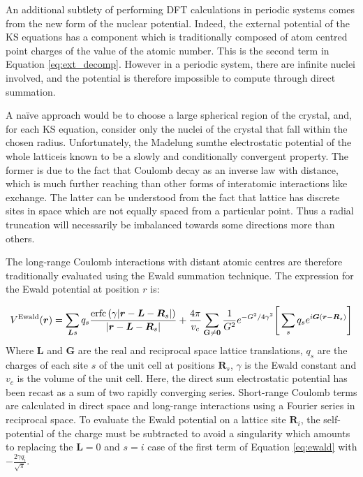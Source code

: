 An additional subtlety of performing DFT calculations in periodic systems comes from the new form of the nuclear potential. Indeed, the external potential of the KS equations has a component which is traditionally composed of atom centred point charges of the value of the atomic number. This is the second term in Equation \ref{eq:ext_decomp}. However in a periodic system, there are infinite nuclei involved, and the potential is therefore impossible to compute through direct summation.

A na\"{i}ve approach would be to choose a large spherical region of the crystal, and, for each KS equation, consider only the nuclei of the crystal that fall within the chosen radius. Unfortunately, the Madelung sum\textemdash{}the electrostatic potential of the whole lattice\textemdash{}is known to be a slowly and conditionally convergent property.\cite{Kittel1986,Kantorovich2004} The former is due to the fact that Coulomb decay as an inverse law with distance, which is much further reaching than other forms of interatomic interactions like exchange. The latter can be understood from the fact that lattice has discrete sites in space which are not equally spaced from a particular point. Thus a radial truncation will necessarily be imbalanced towards some directions more than others.

The long-range Coulomb interactions with distant atomic centres are therefore traditionally evaluated using the Ewald summation technique\cite{Weber2010,Torras2008,McKenna2007}. The expression for the Ewald potential at position $r$ is:

\begin{equation}
V^{\text{Ewald}} ( \bm{r} ) = \sum_{\bm{L}s} q_s \frac{\operatorname{erfc}{}(\gamma|\bm{r} - \bm{L} - \bm{R}_s|)} {|\bm{r} - \bm{L} - \bm{R}_s|}
+ \frac{4 \pi} {v_c}
\sum_{\bf{G}\neq 0} \frac{1}{G^2} e^{-G^2/4\gamma^2}
\Bigg{[}\sum_s q_s e^{i\bm{G}(\bm{r} - \bm{R}_s )}\Bigg{]}
\label{eq:ewald}
\end{equation}
Where $\bm{L}$ and $\bm{G}$ are the real and reciprocal space lattice translations, $q_s$ are the charges of each site $s$ of the unit cell at positions $\bm{R}_s$, $\gamma$ is the Ewald constant and $v_c$  is the volume of the unit cell. Here, the direct sum electrostatic potential has been recast as a sum of two rapidly converging series. Short-range Coulomb terms are calculated in direct space and long-range interactions using a Fourier series in reciprocal space. To evaluate the Ewald potential on a lattice site $\bm{R}_i$, the self-potential of the charge must be subtracted to avoid a singularity which amounts to replacing the $\bm{L} = 0$ and $s = i$ case of the first term of Equation \ref{eq:ewald} with $- \frac{2 \gamma q_i}{\sqrt{\pi}}$.\cite{Kantorovich2004,Kittel1986,Toukmaji1996,Sauer1989a}


